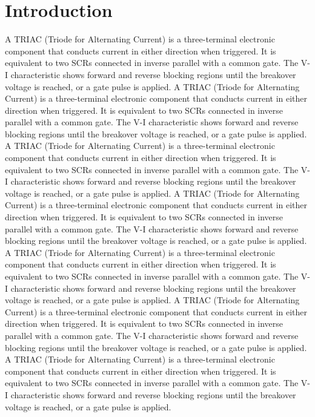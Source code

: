 \documentclass[12pt,a4paper]{article}
\begin{document}
\section{Introduction}
A TRIAC (Triode for Alternating Current) is a three-terminal electronic component that conducts current in either direction when triggered. It is equivalent to two SCRs connected in inverse parallel with a common gate. The V-I characteristic shows forward and reverse blocking regions until the breakover voltage is reached, or a gate pulse is applied. A TRIAC (Triode for Alternating Current) is a three-terminal electronic component that conducts current in either direction when triggered. It is equivalent to two SCRs connected in inverse parallel with a common gate. The V-I characteristic shows forward and reverse blocking regions until the breakover voltage is reached, or a gate pulse is applied. A TRIAC (Triode for Alternating Current) is a three-terminal electronic component that conducts current in either direction when triggered. It is equivalent to two SCRs connected in inverse parallel with a common gate. The V-I characteristic shows forward and reverse blocking regions until the breakover voltage is reached, or a gate pulse is applied. A TRIAC (Triode for Alternating Current) is a three-terminal electronic component that conducts current in either direction when triggered. It is equivalent to two SCRs connected in inverse parallel with a common gate. The V-I characteristic shows forward and reverse blocking regions until the breakover voltage is reached, or a gate pulse is applied. A TRIAC (Triode for Alternating Current) is a three-terminal electronic component that conducts current in either direction when triggered. It is equivalent to two SCRs connected in inverse parallel with a common gate. The V-I characteristic shows forward and reverse blocking regions until the breakover voltage is reached, or a gate pulse is applied. A TRIAC (Triode for Alternating Current) is a three-terminal electronic component that conducts current in either direction when triggered. It is equivalent to two SCRs connected in inverse parallel with a common gate. The V-I characteristic shows forward and reverse blocking regions until the breakover voltage is reached, or a gate pulse is applied. A TRIAC (Triode for Alternating Current) is a three-terminal electronic component that conducts current in either direction when triggered. It is equivalent to two SCRs connected in inverse parallel with a common gate. The V-I characteristic shows forward and reverse blocking regions until the breakover voltage is reached, or a gate pulse is applied. 
\end{document}
